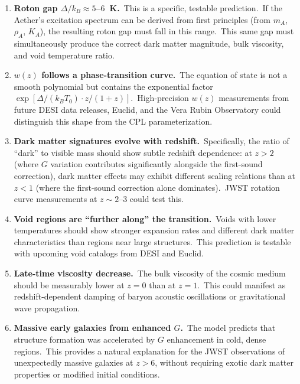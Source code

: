 \documentclass[12pt,letterpaper]{article}
\newcommand{\rhoa}{\rho_{\!A}}
\newcommand{\Ka}{K_{\!A}}
\begin{document}
\begin{enumerate}[leftmargin=2em]
  \item \textbf{Roton gap $\Delta/k_B \approx 5$--$6$~K.}\ This is a specific,
    testable prediction.\ If the Aether's excitation spectrum can be derived
    from first principles (from $m_A$, $\rhoa$, $\Ka$), the resulting roton gap
    must fall in this range.\ This same gap must simultaneously produce the
    correct dark matter magnitude, bulk viscosity, and void temperature ratio.

  \item \textbf{$w(z)$ follows a phase-transition curve.}\ The equation of state
    is not a smooth polynomial but contains the exponential factor
    $\exp[\Delta/(k_B T_0) \cdot z/(1+z)]$.\ High-precision $w(z)$ measurements
    from future DESI data releases, Euclid, and the Vera Rubin Observatory
    could distinguish this shape from the CPL parameterization.

  \item \textbf{Dark matter signatures evolve with redshift.}\ Specifically,
    the ratio of ``dark'' to visible mass should show subtle redshift dependence:
    at $z > 2$ (where $G$ variation contributes significantly alongside the
    first-sound correction), dark matter effects may exhibit different scaling
    relations than at $z < 1$ (where the first-sound correction alone
    dominates).\ JWST rotation curve measurements at $z \sim 2$--$3$
    could test this.

  \item \textbf{Void regions are ``further along'' the transition.}\ Voids
    with lower temperatures should show stronger expansion rates and different
    dark matter characteristics than regions near large structures.\ This
    prediction is testable with upcoming void catalogs from DESI and Euclid.

  \item \textbf{Late-time viscosity decrease.}\ The bulk viscosity of the cosmic
    medium should be measurably lower at $z = 0$ than at $z = 1$.\ This could
    manifest as redshift-dependent damping of baryon acoustic oscillations or
    gravitational wave propagation.

  \item \textbf{Massive early galaxies from enhanced $G$.}\ The model predicts
    that structure formation was accelerated by $G$ enhancement in cold, dense
    regions.\ This provides a natural explanation for the JWST observations of
    unexpectedly massive galaxies at $z > 6$, without requiring exotic dark
    matter properties or modified initial conditions.
\end{enumerate}
\end{document}
